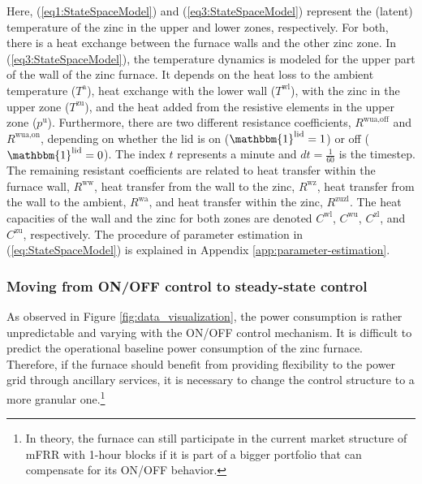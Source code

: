 \documentclass[sigconf]{acmart}
\begin{document}
Here, (\ref{eq1:StateSpaceModel}) and (\ref{eq3:StateSpaceModel}) represent the (latent) temperature of the zinc in the upper and lower zones, respectively. For both, there is a heat exchange between the furnace walls and the other zinc zone. In (\ref{eq3:StateSpaceModel}), the temperature dynamics is modeled for the upper part of the wall of the zinc furnace. It depends on the heat loss to the ambient temperature ($T^{\text{a}}$), heat exchange with the lower wall ($T^{\text{wl}}$), with the zinc in the upper zone ($T^{\text{zu}}$), and the heat added from the resistive elements in the upper zone  ($p^{\text{u}}$). Furthermore, there are two different resistance coefficients, $R^{\text{wua},\text{off}}$ and $R^{\text{wua},\text{on}}$, depending on whether the lid is on ($ \mathbbm{1}^{\text{lid}} = 1$) or off ($ \mathbbm{1}^{\text{lid}} = 0$). The index $t$ represents a minute and $dt = \frac{1}{60}$ is the timestep. The remaining resistant coefficients are related to heat transfer within the furnace wall, $R^{\text{ww}}$, heat transfer from the wall to the zinc, $R^{\text{wz}}$, heat transfer from the wall to the ambient, $R^{\text{wa}}$, and heat transfer within the zinc, $R^{\text{zuzl}}$. The heat capacities of the wall and the zinc for both zones are denoted $C^{\text{wl}}$, $C^{\text{wu}}$, $C^{\text{zl}}$, and $C^{\text{zu}}$, respectively. The procedure of parameter estimation in (\ref{eq:StateSpaceModel}) is explained in Appendix \ref{app:parameter-estimation}.


\subsubsection{Moving from ON/OFF control to steady-state control}

As observed in Figure \ref{fig:data_visualization}, the power consumption is rather unpredictable and varying with the ON/OFF control mechanism. It is difficult to predict the operational baseline power consumption of the zinc furnace. Therefore, if the furnace should benefit from providing flexibility to the power grid through ancillary services, it is necessary to change the control structure to a more granular one.\footnote{In theory, the furnace can still participate in the current market structure of mFRR with 1-hour blocks if it is part of a bigger portfolio that can compensate for its ON/OFF behavior.}
\end{document}
